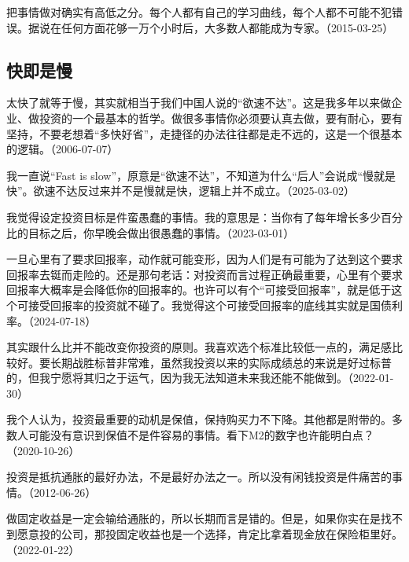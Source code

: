 把事情做对确实有高低之分。每个人都有自己的学习曲线，每个人都不可能不犯错误。据说在任何方面花够一万个小时后，大多数人都能成为专家。（2015-03-25）

\subsection{快即是慢}


太快了就等于慢，其实就相当于我们中国人说的“欲速不达”。这是我多年以来做企业、做投资的一个最基本的哲学。做很多事情你必须要认真去做，要有耐心，要有坚持，不要老想着“多快好省”，走捷径的办法往往都是走不远的，这是一个很基本的逻辑。（2006-07-07）

我一直说“Fast is slow”，原意是“欲速不达”，不知道为什么“后人”会说成“慢就是快”。欲速不达反过来并不是慢就是快，逻辑上并不成立。（2025-03-02）

我觉得设定投资目标是件蛮愚蠢的事情。我的意思是：当你有了每年增长多少百分比的目标之后，你早晚会做出很愚蠢的事情。（2023-03-01）

一旦心里有了要求回报率，动作就可能变形，因为人们是有可能为了达到这个要求回报率去铤而走险的。还是那句老话：对投资而言过程正确最重要，心里有个要求回报率大概率是会降低你的回报率的。也许可以有个“可接受回报率”，就是低于这个可接受回报率的投资就不碰了。我觉得这个可接受回报率的底线其实就是国债利率。（2024-07-18）


其实跟什么比并不能改变你投资的原则。我喜欢选个标准比较低一点的，满足感比较好。要长期战胜标普非常难，虽然我投资以来的实际成绩总的来说是好过标普的，但我宁愿将其归之于运气，因为我无法知道未来我还能不能做到。（2022-01-30）

我个人认为，投资最重要的动机是保值，保持购买力不下降。其他都是附带的。多数人可能没有意识到保值不是件容易的事情。看下M2的数字也许能明白点？（2020-10-26）

投资是抵抗通胀的最好办法，不是最好办法之一。所以没有闲钱投资是件痛苦的事情。（2012-06-26）

做固定收益是一定会输给通胀的，所以长期而言是错的。但是，如果你实在是找不到愿意投的公司，那投固定收益也是一个选择，肯定比拿着现金放在保险柜里好。（2022-01-22）


